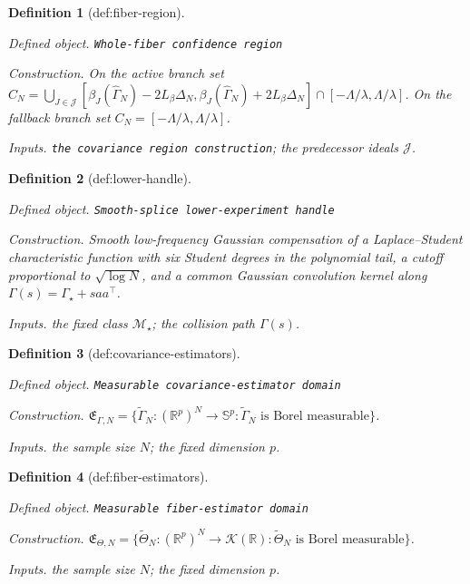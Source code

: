 \documentclass{article}
\newtheorem{definition}{Definition}
\begin{document}
\begin{definition}[def:fiber-region]\label{def:fiber-region}
\par\smallskip\noindent\emph{Defined object.} \texttt{Whole-\allowbreak{}fiber confidence region}
\par\smallskip\noindent\emph{Construction.} On the active branch set \(C_N=\bigcup_{J\in\mathcal J}[\beta_J(\widehat\Gamma_N)-2L_\beta\Delta_N,\beta_J(\widehat\Gamma_N)+2L_\beta\Delta_N]\cap[-\Lambda/\lambda,\Lambda/\lambda]\). On the fallback branch set \(C_N=[-\Lambda/\lambda,\Lambda/\lambda]\).
\par\smallskip\noindent\emph{Inputs.} \texttt{the covariance region construction}; the predecessor ideals \(\mathcal J\).
\end{definition}

\begin{definition}[def:lower-handle]\label{def:lower-handle}
\par\smallskip\noindent\emph{Defined object.} \texttt{Smooth-\allowbreak{}splice lower-\allowbreak{}experiment handle}
\par\smallskip\noindent\emph{Construction.} Smooth low-frequency Gaussian compensation of a Laplace--Student characteristic function with six Student degrees in the polynomial tail, a cutoff proportional to \(\sqrt{\log N}\), and a common Gaussian convolution kernel along \(\Gamma(s)=\Gamma_\star+saa^\top\).
\par\smallskip\noindent\emph{Inputs.} the fixed class \(\mathcal M_\star\); the collision path \(\Gamma(s)\).
\end{definition}

\begin{definition}[def:covariance-estimators]\label{def:covariance-estimators}
\par\smallskip\noindent\emph{Defined object.} \texttt{Measurable covariance-\allowbreak{}estimator domain}
\par\smallskip\noindent\emph{Construction.} \(\mathfrak E_{\Gamma,N}=\{\widetilde\Gamma_N:(\mathbb R^p)^N\to\mathbb S^p:\widetilde\Gamma_N\text{ is Borel measurable}\}\).
\par\smallskip\noindent\emph{Inputs.} the sample size \(N\); the fixed dimension \(p\).
\end{definition}

\begin{definition}[def:fiber-estimators]\label{def:fiber-estimators}
\par\smallskip\noindent\emph{Defined object.} \texttt{Measurable fiber-\allowbreak{}estimator domain}
\par\smallskip\noindent\emph{Construction.} \(\mathfrak E_{\Theta,N}=\{\widetilde\Theta_N:(\mathbb R^p)^N\to\mathcal K(\mathbb R):\widetilde\Theta_N\text{ is Borel measurable}\}\).
\par\smallskip\noindent\emph{Inputs.} the sample size \(N\); the fixed dimension \(p\).
\end{definition}
\end{document}
